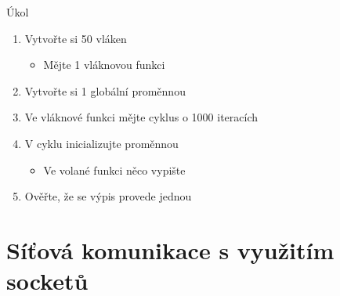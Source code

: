 \begin{frame}{Úkol}

  \begin{enumerate}
    \item Vytvořte si 50 vláken
    \begin{itemize}
      \item Mějte 1 vláknovou funkci
    \end{itemize}

    \item Vytvořte si 1 globální  proměnnou
    \item Ve vláknové funkci mějte cyklus o 1000 iteracích
    \item V cyklu inicializujte  proměnnou
    \begin{itemize}
      \item Ve volané funkci něco vypište
    \end{itemize}

    \item Ověřte, že se výpis provede jednou
  \end{enumerate}

\end{frame}

\section{Síťová komunikace s využitím socketů}
\frame{\sectionpage}



